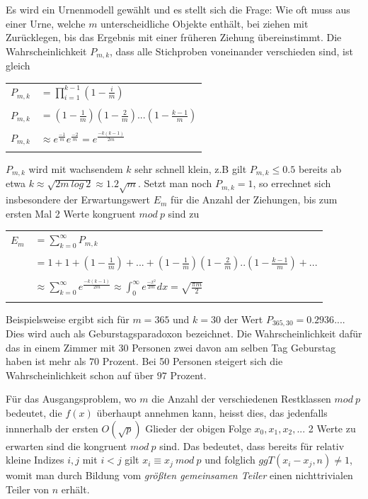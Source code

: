 \documentclass[a4paper,11pt]{article}
\begin{document}
Es wird ein Urnenmodell gewählt und es stellt sich die Frage: Wie oft
muss aus einer Urne, welche $m$ unterscheidliche Objekte enthält, bei ziehen
mit Zurücklegen, bis das Ergebnis mit einer früheren Ziehung übereinstimmt.
Die Wahrscheinlichkeit $P_{m,k}$, dass alle Stichproben voneinander
verschieden sind, ist gleich
\begin{center}
\begin{tabular}{ll}
$P_{m,k}$ & $ = \prod_{i=1}^{k-1}(1- \frac{i}{m})$\\\\
$P_{m,k}$ & $= (1-\frac{1}{m})(1-\frac{2}{m})...(1-\frac{k-1}{m})$\\\\
$P_{m,k}$ & $\approx e^{\frac{-1}{m}} e^{\frac{-2}{m}} = e^{\frac{-k(k-1)}{2m}}$\\\\
\end{tabular}
\end{center}
$P_{m,k}$ wird mit wachsendem $k$ sehr schnell klein, z.B gilt $P_{m,k}\leq0.5$
bereits ab etwa $k\approx\sqrt{2m\ log\ 2}\approx1.2\sqrt{m}$. Setzt man noch
$P_{m,k} = 1$, so errechnet sich insbesondere der Erwartungswert $E_m$ für die
Anzahl der Ziehungen, bis zum ersten Mal 2 Werte kongruent $mod\ p$ sind zu\\
\begin{center}
\begin{tabular}{ll}
$E_m$ & $= \sum_{k=0}^\infty P_{m,k}$\\\\
	& $= 1+1+(1-\frac{1}{m})+...+(1-\frac{1}{m})(1-\frac{2}{m})..(1-\frac{k-1}{m})+...$\\\\
	& $\approx \sum_{k=0}^\infty e^{\frac{-k(k-1)}{2m}}
	 \approx \int_0^\infty e^{\frac{-x^2}{2m}}dx = \sqrt{\frac{\pi m}{2}}$\\\\
\end{tabular}
\end{center}

Beispielsweise ergibt sich für $m=365$ und $k=30$ der Wert $P_{365,30} = 0.2936...$.
Dies wird auch als Geburstagsparadoxon bezeichnet. Die Wahrscheinlichkeit dafür
das in einem Zimmer mit 30 Personen zwei davon am selben Tag Geburstag haben ist
mehr als $70$ Prozent. Bei 50 Personen steigert sich die Wahrscheinlichkeit schon
auf über $97$ Prozent.

Für das Ausgangsproblem, wo $m$ die Anzahl der verschiedenen Restklassen $mod\ p$
bedeutet, die $f(x)$ überhaupt annehmen kann, heisst dies, das jedenfalls innnerhalb
der ersten $O(\sqrt{p})$ Glieder der obigen Folge $x_0, x_1, x_2,...$ 2 Werte
zu erwarten sind die kongruent $mod\ p$ sind. Das bedeutet, dass bereits für relativ
kleine Indizes $i,j$ mit $i<j$ gilt $x_i \equiv x_j\ mod\ p$ und folglich
$ggT(x_i-x_j,n) \neq 1$, womit man durch Bildung vom \textit{größten gemeinsamen Teiler}
 einen nichttrivialen Teiler von $n$ erhält.
\end{document}
